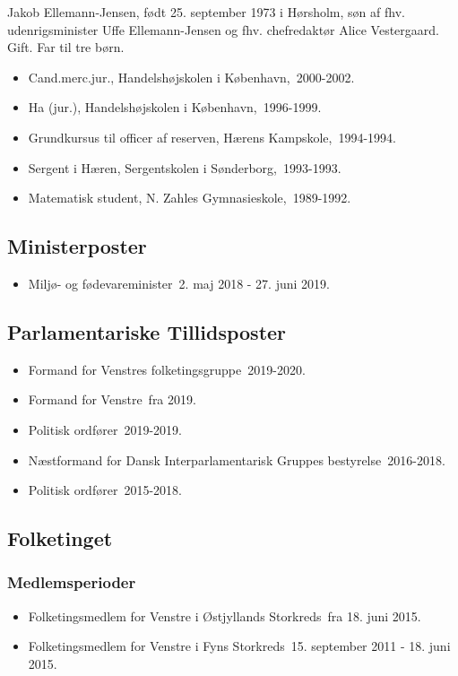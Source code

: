 \documentclass[11pt, a4paper]{awesome-cv}
\begin{document}
\makecvheader[R]
\makelettertitle
\begin{cvletter}
Jakob Ellemann-Jensen, født 25. september 1973 i Hørsholm, søn af fhv. udenrigsminister Uffe Ellemann-Jensen og fhv. chefredaktør Alice Vestergaard. Gift. Far til tre børn.

\begin{itemize}
\item Cand.merc.jur., Handelshøjskolen i København, 2000-2002.
\item Ha (jur.), Handelshøjskolen i København, 1996-1999.
\item Grundkursus til officer af reserven, Hærens Kampskole, 1994-1994.
\item Sergent i Hæren, Sergentskolen i Sønderborg, 1993-1993.
\item Matematisk student, N. Zahles Gymnasieskole, 1989-1992.
\end{itemize}
\subsection*{Ministerposter}
\begin{itemize}
\item Miljø- og fødevareminister 2. maj 2018 - 27. juni 2019.
\end{itemize}
\subsection*{Parlamentariske Tillidsposter}
\begin{itemize}
\item Formand for Venstres folketingsgruppe 2019-2020.
\item Formand for Venstre fra 2019.
\item Politisk ordfører 2019-2019.
\item Næstformand for Dansk Interparlamentarisk Gruppes bestyrelse 2016-2018.
\item Politisk ordfører 2015-2018.
\end{itemize}
\subsection*{Folketinget}
\subsubsection*{Medlemsperioder}
\begin{itemize}
\item Folketingsmedlem for Venstre i Østjyllands Storkreds fra 18. juni 2015.
\item Folketingsmedlem for Venstre i Fyns Storkreds 15. september 2011 - 18. juni 2015.
\end{itemize}

\end{cvletter}
\end{document}
